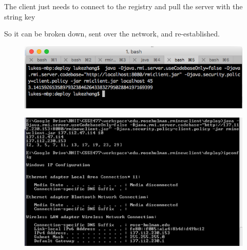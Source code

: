 \documentclass[12pt,letterpaper,boxed]{hmcpset}
\begin{document}
The client just needs to connect to the registry and pull the server with the string key \newline\newline
\begin{problem}
\end{problem}

So it can be broken down, sent over the network, and re-established. \newline \newline
\begin{problem}
\end{problem}
\begin{figure}[H]
  \centering
  \includegraphics[width = 1.0\textwidth]{1.png}
\end{figure}
\begin{problem}
\end{problem}
\begin{figure}[H]
  \centering
  \includegraphics[width = 1.0\textwidth]{2.png}
\end{figure}
\end{document}
